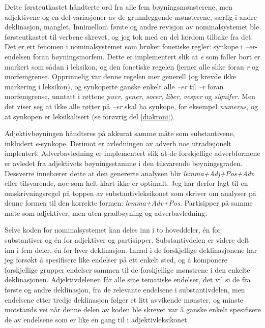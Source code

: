 \documentclass{article}
\let\form\emph
\let\w\emph
\begin{document}
Dette f\o{}rsteutkastet h\aa{}ndterte ord fra alle fem
b\o{}yningsm\o{}nsterene, men adjektivene og en del variasjoner av de
grunnleggende m\o{}nsterene, s\ae{}rlig i andre deklinasjon, manglet.
Innimellom f\o{}rste og andre revisjon av nominalsystemet ble
f\o{}rsteutkastet til verbene skrevet, og jeg tok med en del l\ae{}rdom
tilbake fra det. Det er ett fenomen i nominalsystemet som bruker fonetiske
regler: synkope i \w{--er}-endelsen foran b\o{}yningsmorfem. Dette er
implementert slik at \w{e} som faller bort er markert som s\aa{}dan i
leksikon, og den fonetiske regelen fjerner alle slike foran \w{r} og
morfemgrense. Opprinnelig var denne regelen mer generell (og krevde ikke
markering i leksikon), og synkoperte ganske enkelt alle \w{--er} til \w{--r}
foran morfemgrense, unntatt i r\o{}ttene \w{puer}, \w{gener}, \w{socer},
\w{liber}, \w{vesper} og \w{signifer}. Men det viser seg at ikke alle
r\o{}tter p\aa{} \w{--er} skal ha synkope, for eksempel \w{numerus}, og at
synkopen er leksikalisert (se for\o{}vrig del \ref{diakroni}).

Adjektivb\o{}yningen h\aa{}ndteres p\aa{} akkurat samme m\aa{}te som
substantivene, inkludert \w{e}-synkope. Derimot er avledningen av adverb noe
utradisjonelt implentert. Adverbavledning er implementert slik at de
forskjellige adverbformene er avledet fra adjektivets b\o{}yningsstamme i den
tilsvarende b\o{}yningsgraden. Dessverre inneb\ae{}rer dette at den genererte
analysen blir \form{lemma+Adj+Pos+Adv} eller tilsvarende, noe som helt klart
ikke er optimalt. Jeg har derfor lagt til en omskrivningsregel p\aa{} toppen
av substantivleksikonet som skriver om analyser p\aa{} denne formen til den
korrekte formen: \form{lemma+Adv+Pos}. Partisipper p\aa{} samme m\aa{}te som
adjektiver, men uten gradb\o{}yning og adverbavledning.

Selve koden for nominalsystemet kan deles inn i to hoveddeler, \'en for
substantiver og \'en for adjektiver og partisipper. Substantivdelen er videre
delt inn i fem deler, \'en for hver deklinasjon. Innad i de forskjellige
deklinasjonene har jeg fors\o{}kt \aa{} spesifisere like endelser p\aa{} ett
enkelt sted, og \aa{} komponere forskjellige grupper endelser sammen til de
forskjellige m\o{}nstrene i den enkelte deklinasjonen. Adjektivdelenen f\aa{}r
alle sine tematiske endelser, det vil si de fra f\o{}rste og andre
deklinasjon, fra de relevante endelsene i substantivdelen, men endelsene etter
tredje deklinasjon f\o{}lger et litt avvikende m\o{}nster, og minste motstands
vei n\aa{}r denne delen av koden ble skrevet var \aa{} ganske enkelt
spesifisere de av endelsene som er like en gang til i adjektivleksikonet.
\end{document}
